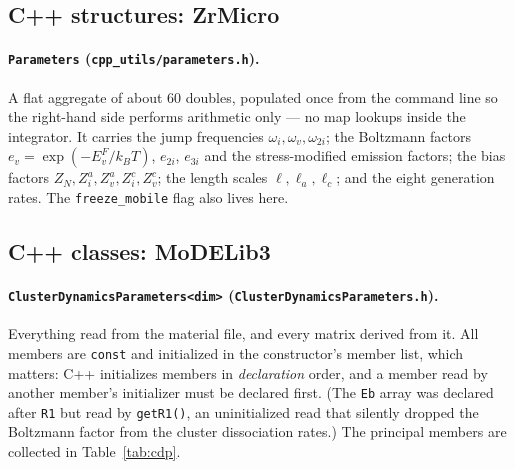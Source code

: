 \documentclass[11pt]{article}
\newcommand{\ZrM}{\textsf{ZrMicro}}
\newcommand{\MoD}{\textsf{MoDELib3}}
\newcommand{\code}[1]{\texttt{\small #1}}
\newcommand{\file}[1]{\texttt{\footnotesize #1}}
\begin{document}
\subsection{C++ structures: \ZrM{}}

\paragraph*{\code{Parameters} (\file{cpp\_utils/parameters.h}).}
A flat aggregate of about 60 doubles, populated once from the command line so the
right-hand side performs arithmetic only --- no map lookups inside the integrator.
It carries the jump frequencies $\omega_i, \omega_v, \omega_{2i}$; the Boltzmann
factors $e_v = \exp(-E^F_v/k_BT)$, $e_{2i}$, $e_{3i}$ and the stress-modified
emission factors; the bias factors $Z_N, Z^a_i, Z^a_v, Z^c_i, Z^c_v$; the length
scales $\ell, \ell_a, \ell_c$; and the eight generation rates. The
\code{freeze\_mobile} flag also lives here.

\subsection{C++ classes: \MoD{}}

\paragraph*{\code{ClusterDynamicsParameters<dim>} (\file{ClusterDynamicsParameters.h}).}
Everything read from the material file, and every matrix derived from it. All
members are \code{const} and initialized in the constructor's member list, which
matters: C++ initializes members in \emph{declaration} order, and a member read
by another member's initializer must be declared first. (The \code{Eb} array was
declared after \code{R1} but read by \code{getR1()}, an uninitialized read that
silently dropped the Boltzmann factor from the cluster dissociation rates.) The
principal members are collected in Table~\ref{tab:cdp}.
\end{document}
